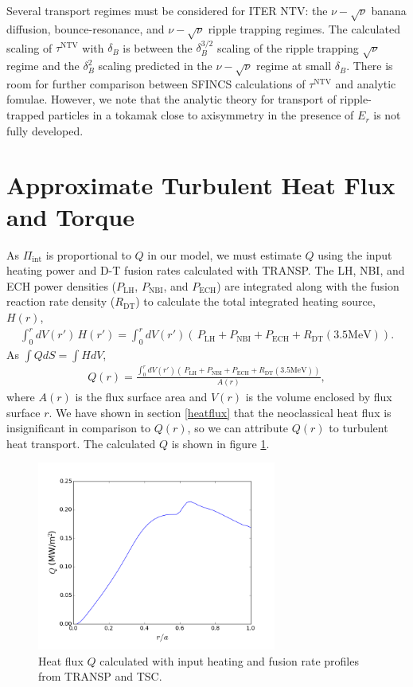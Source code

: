 \documentclass[aip, pop, preprint]{revtex4-1}
\numberwithin{figure}{section}
\numberwithin{equation}{section}
\begin{document}
Several transport regimes must be considered for ITER NTV: the $\nu-\sqrt{\nu}$ banana diffusion, bounce-resonance, and $\nu-\sqrt{\nu}$ ripple trapping regimes. The calculated scaling of $\tau^{\text{NTV}}$ with $\delta_B$ is between the $\delta_B^{3/2}$ scaling of the ripple trapping $\sqrt{\nu}$ regime and the $\delta_B^2$ scaling predicted in the $\nu-\sqrt{\nu}$ regime at small $\delta_B$. There is room for further comparison between SFINCS calculations of $\tau^{\text{NTV}}$ and analytic fomulae. However, we note that the analytic theory for transport of ripple-trapped particles in a tokamak close to axisymmetry in the presence of $E_r$ is not fully developed. 

\appendix

\section{Approximate Turbulent Heat Flux and Torque}\label{turbQ}

As $\Pi_{\text{int}}$ is proportional to $Q$ in our model, we must estimate $Q$ using the input heating power and D-T fusion rates calculated with TRANSP. The LH, NBI, and ECH power densities ($P_{\text{LH}}$, $P_{\text{NBI}}$, and $P_{\text{ECH}}$) are integrated along with the fusion reaction rate density ($R_{\text{DT}}$) to calculate the total integrated heating source, $H(r)$,
\begin{gather}
\int_0^r dV(r') \, H(r') = \int_0^r dV(r') \left(\, P_{\text{LH}} + P_{\text{NBI}} + P_{\text{ECH}} + R_{\text{DT}} (3.5 \text{MeV}) \right).
\end{gather}
As $\int Q dS = \int H dV$, 
\begin{gather}
Q(r) = \frac{\int_0^{r} dV(r') \left(\, P_{\text{LH}} + P_{\text{NBI}} + P_{\text{ECH}} + R_{\text{DT}} (3.5 \text{MeV}) \right)}{A(r)},
\end{gather}
where $A(r)$ is the flux surface area and $V(r)$ is the volume enclosed by flux surface $r$. We have shown in section \ref{heatflux} that the neoclassical heat flux is insignificant in comparison to $Q(r)$, so we can attribute $Q(r)$ to turbulent heat transport. The calculated $Q$ is shown in figure \ref{fig:turbHeatFlux}.

\begin{figure}[h!]
\centering
\includegraphics[width=0.7\textwidth]{turbHeatFlux.png}
\caption{\label{fig:turbHeatFlux} Heat flux $Q$ calculated with input heating and fusion rate profiles from TRANSP and TSC.}
\end{figure}
\end{document}
